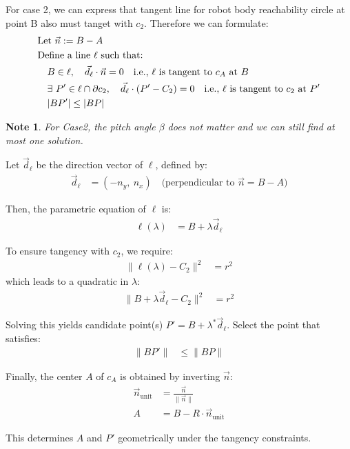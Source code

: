\documentclass[11pt]{article}
\newtheorem{note}[statement]{Note}
\begin{document}
\indent \indent For case 2, we can express that tangent line for robot body reachability circle
at point B also must tanget with \(c_2\). Therefore we can formulate:
\begin{align*}
    &\text{Let } \vec{n} := B - A \\
    &\text{Define a line } \ell \text{ such that:} \\
    &\quad B \in \ell,\quad \vec{d}_\ell \cdot \vec{n} = 0 \quad \text{i.e., }\ell \text{ is tangent to } c_A \text{ at } B \\
    &\quad \exists\ P' \in \ell \cap \partial c_2,\quad \vec{d}_\ell \cdot (P' - C_2) = 0 \quad \text{i.e., } \ell \text{ is tangent to } c_2 \text{ at } P'\\
    &\quad \abs{BP'} \leq \abs{BP}
\end{align*}

\begin{note}
    For Case2, the pitch angle \(\beta\) does not matter and we can still find at most one solution.
\end{note}

Let $\vec{d}_\ell$ be the direction vector of $\ell$, defined by:
\begin{align*}
    \vec{d}_\ell &= (-n_y,\ n_x) \quad \text{(perpendicular to } \vec{n} = B - A\text{)}
\end{align*}

Then, the parametric equation of $\ell$ is:
\begin{align*}
    \ell(\lambda) &= B + \lambda \vec{d}_\ell
\end{align*}

To ensure tangency with $c_2$, we require:
\begin{align*}
    \|\ell(\lambda) - C_2\|^2 &= r^2
\end{align*}
which leads to a quadratic in $\lambda$:
\begin{align*}
    \|B + \lambda \vec{d}_\ell - C_2\|^2 &= r^2
\end{align*}

Solving this yields candidate point(s) $P' = B + \lambda^* \vec{d}_\ell$.
Select the point that satisfies:
\begin{align*}
    \|BP'\| &\leq \|BP\|
\end{align*}

Finally, the center $A$ of $c_A$ is obtained by inverting $\vec{n}$:
\begin{align*}
    \vec{n}_{\text{unit}} &= \frac{\vec{n}}{\|\vec{n}\|} \\
    A &= B - R \cdot \vec{n}_{\text{unit}}
\end{align*}

This determines $A$ and $P'$ geometrically under the tangency constraints.
\end{document}
